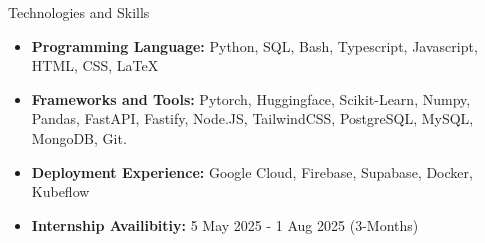 \documentclass[]{mcdowellcv}
\begin{document}
	\begin{cvsection}{Technologies and Skills}
		\begin{cvsubsection}{}{}{}	
			\begin{itemize}
				\item \textbf{Programming Language: } Python, SQL, Bash, Typescript, Javascript, HTML, CSS, \LaTeX
				\item \textbf{Frameworks and Tools: } Pytorch, Huggingface, Scikit-Learn, Numpy, Pandas, FastAPI, Fastify, Node.JS, TailwindCSS, PostgreSQL, MySQL, MongoDB, Git.
				\item \textbf{Deployment Experience: } Google Cloud, Firebase, Supabase, Docker, Kubeflow
				\item \textbf{Internship Availibitiy: } 5 May 2025 - 1 Aug 2025 (3-Months)
			\end{itemize}
		\end{cvsubsection}
	\end{cvsection}
	
\end{document}
